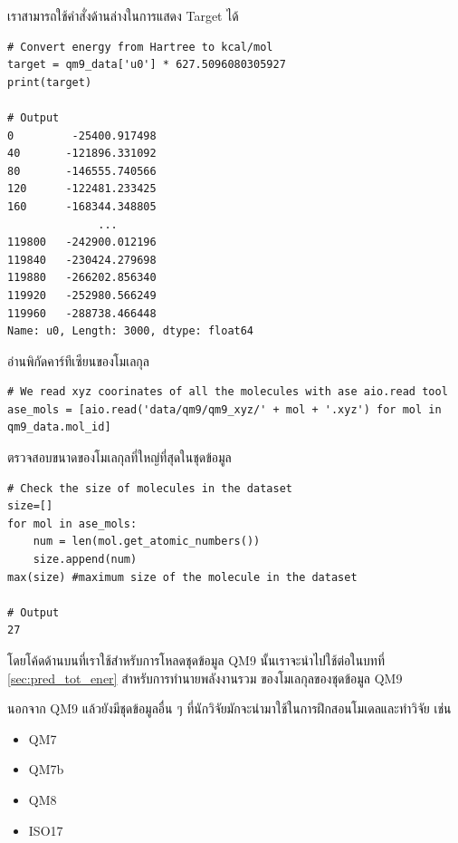 \noindent เราสามารถใช้คำสั่งด้านล่างในการแสดง Target ได้

\begin{lstlisting}[style=MyPython]
# Convert energy from Hartree to kcal/mol
target = qm9_data['u0'] * 627.5096080305927 
print(target)

# Output
0         -25400.917498
40       -121896.331092
80       -146555.740566
120      -122481.233425
160      -168344.348805
              ...      
119800   -242900.012196
119840   -230424.279698
119880   -266202.856340
119920   -252980.566249
119960   -288738.466448
Name: u0, Length: 3000, dtype: float64
\end{lstlisting}

\noindent อ่านพิกัดคาร์ทีเซียนของโมเลกุล

\begin{lstlisting}[style=MyPython]
# We read xyz coorinates of all the molecules with ase aio.read tool
ase_mols = [aio.read('data/qm9/qm9_xyz/' + mol + '.xyz') for mol in qm9_data.mol_id]
\end{lstlisting}

\noindent ตรวจสอบขนาดของโมเลกุลที่ใหญ่ที่สุดในชุดข้อมูล

\begin{lstlisting}[style=MyPython]
# Check the size of molecules in the dataset
size=[]
for mol in ase_mols:
    num = len(mol.get_atomic_numbers())
    size.append(num)
max(size) #maximum size of the molecule in the dataset

# Output
27
\end{lstlisting}

โดยโค้ดด้านบนที่เราใช้สำหรับการโหลดชุดข้อมูล QM9 นั้นเราจะนำไปใช้ต่อในบทที่ \ref{sec:pred_tot_ener} สำหรับการทำนายพลังงานรวม%
ของโมเลกุลของชุดข้อมูล QM9

นอกจาก QM9 แล้วยังมีชุดข้อมูลอื่น ๆ ที่นักวิจัยมักจะนำมาใช้ในการฝึกสอนโมเดลและทำวิจัย เช่น 

\begin{itemize}[topsep=0pt]
    \item QM7\autocite{blum2009,rupp2012a}
    
    \item QM7b\autocite{blum2009,montavon2013}
    
    \item QM8\autocite{ruddigkeit2012,ramakrishnan2015}
    
    \item ISO17\autocite{schutt2017,schutt2017a,ramakrishnan2014}
\end{itemize}

